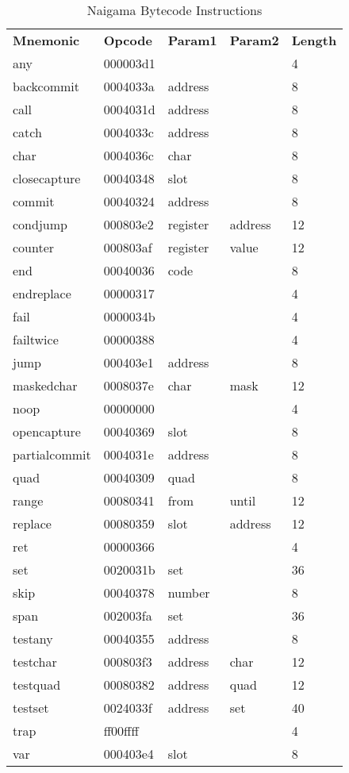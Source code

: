 
\begin{table}[]
\centering
\caption{Naigama Bytecode Instructions}
\label{tab:naig_bytecode}
\begin{tabular}{lllll}
\textbf{Mnemonic} & \textbf{Opcode} & \textbf{Param1} & \textbf{Param2} & \textbf{Length} \\
any & 000003d1 &  &   & 4 \\
backcommit & 0004033a & address &   & 8 \\
call & 0004031d & address &   & 8 \\
catch & 0004033c & address &   & 8 \\
char & 0004036c & char &   & 8 \\
closecapture & 00040348 & slot &   & 8 \\
commit & 00040324 & address &   & 8 \\
condjump & 000803e2 & register & address  & 12 \\
counter & 000803af & register & value  & 12 \\
end & 00040036 & code &   & 8 \\
endreplace & 00000317 &  &   & 4 \\
fail & 0000034b &  &   & 4 \\
failtwice & 00000388 &  &   & 4 \\
jump & 000403e1 & address &   & 8 \\
maskedchar & 0008037e & char & mask  & 12 \\
noop & 00000000 &  &   & 4 \\
opencapture & 00040369 & slot &   & 8 \\
partialcommit & 0004031e & address &   & 8 \\
quad & 00040309 & quad &   & 8 \\
range & 00080341 & from & until  & 12 \\
replace & 00080359 & slot & address  & 12 \\
ret & 00000366 &  &   & 4 \\
set & 0020031b & set &   & 36 \\
skip & 00040378 & number &   & 8 \\
span & 002003fa & set &   & 36 \\
testany & 00040355 & address &   & 8 \\
testchar & 000803f3 & address & char  & 12 \\
testquad & 00080382 & address & quad  & 12 \\
testset & 0024033f & address & set  & 40 \\
trap & ff00ffff &  &   & 4 \\
var & 000403e4 & slot &   & 8 \\
\end{tabular}
\end{table}
